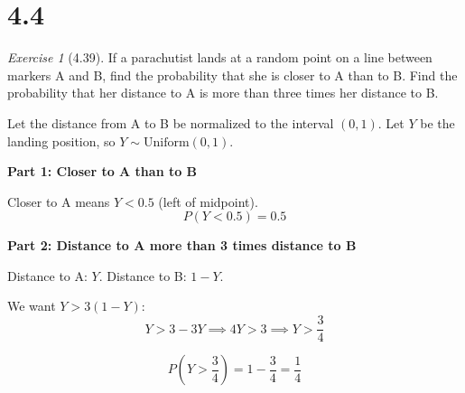 \documentclass[12pt]{amsart}
\makeatletter
\theoremstyle{remark}
\newtheorem*{exercise}{Exercise}%
\renewenvironment{proof}[1][\proofname]{\par\doublespacing
  \pushQED{\qed}%
  \normalfont \topsep6\p@\@plus6\p@\relax
  \list{}{%
    \settowidth{\leftmargin}{\itshape\proofname:\hskip\labelsep}%
    \setlength{\labelwidth}{0pt}%
    \setlength{\itemindent}{-\leftmargin}%
  }%
  \item[\hskip\labelsep\itshape#1\@addpunct{:}]\ignorespaces
}{%
  \popQED\endlist\@endpefalse
  \singlespacing
}
\theoremstyle{mycomment}
\makeatother
\begin{document}
\section*{4.4}
\begin{exercise}[4.39]
If a parachutist lands at a random point on a line between markers A and B, find the probability that she is closer to A than to B. Find the probability that her distance to A is more than three times her distance to B.

\begin{proof}[Solution]
Let the distance from A to B be normalized to the interval $(0, 1)$. Let $Y$ be the landing position, so $Y \sim \text{Uniform}(0, 1)$.

\textbf{Part 1: Closer to A than to B}

Closer to A means $Y < 0.5$ (left of midpoint).
$$P(Y < 0.5) = 0.5$$

\textbf{Part 2: Distance to A more than 3 times distance to B}

Distance to A: $Y$. Distance to B: $1 - Y$.

We want $Y > 3(1 - Y)$:
$$Y > 3 - 3Y \implies 4Y > 3 \implies Y > \frac{3}{4}$$

$$P\left(Y > \frac{3}{4}\right) = 1 - \frac{3}{4} = \frac{1}{4}$$
\end{proof}
\end{exercise}
\end{document}
